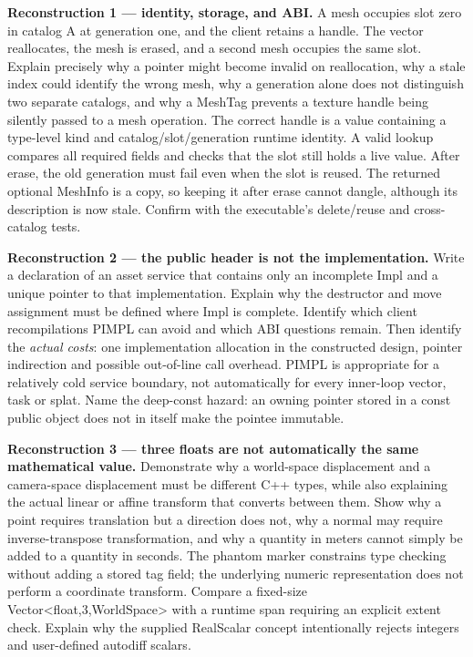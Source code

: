 \textbf{Reconstruction 1 --- identity, storage, and ABI.} A mesh occupies slot zero in catalog A at generation one, and the client retains a handle. The vector reallocates, the mesh is erased, and a second mesh occupies the same slot. Explain precisely why a pointer might become invalid on reallocation, why a stale index could identify the wrong mesh, why a generation alone does not distinguish two separate catalogs, and why a MeshTag prevents a texture handle being silently passed to a mesh operation. The correct handle is a value containing a type-level kind and catalog/slot/generation runtime identity. A valid lookup compares all required fields and checks that the slot still holds a live value. After erase, the old generation must fail even when the slot is reused. The returned optional MeshInfo is a copy, so keeping it after erase cannot dangle, although its description is now stale. Confirm with the executable's delete/reuse and cross-catalog tests.

\textbf{Reconstruction 2 --- the public header is not the implementation.} Write a declaration of an asset service that contains only an incomplete Impl and a unique pointer to that implementation. Explain why the destructor and move assignment must be defined where Impl is complete. Identify which client recompilations PIMPL can avoid and which ABI questions remain. Then identify the \emph{actual costs}: one implementation allocation in the constructed design, pointer indirection and possible out-of-line call overhead. PIMPL is appropriate for a relatively cold service boundary, not automatically for every inner-loop vector, task or splat. Name the deep-const hazard: an owning pointer stored in a const public object does not in itself make the pointee immutable.

\textbf{Reconstruction 3 --- three floats are not automatically the same mathematical value.} Demonstrate why a world-space displacement and a camera-space displacement must be different C++ types, while also explaining the actual linear or affine transform that converts between them. Show why a point requires translation but a direction does not, why a normal may require inverse-transpose transformation, and why a quantity in meters cannot simply be added to a quantity in seconds. The phantom marker constrains type checking without adding a stored tag field; the underlying numeric representation does not perform a coordinate transform. Compare a fixed-size Vector\textless float,3,WorldSpace\textgreater{} with a runtime span requiring an explicit extent check. Explain why the supplied RealScalar concept intentionally rejects integers and user-defined autodiff scalars.

